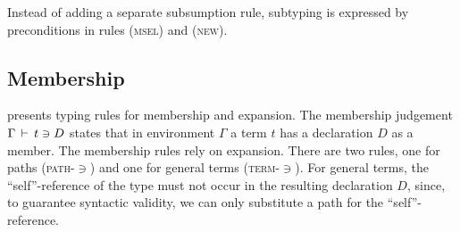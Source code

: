 \documentclass[9pt]{sigplanconf}
\begin{document}
Instead of adding a separate subsumption rule, subtyping is expressed
by preconditions in rules (\textsc{msel}) and (\textsc{new}).


\subsection{Membership}\label{mem}

 presents typing rules for membership and expansion.
The membership judgement $\Gamma \,\vdash\, t \ni D$ states that in
environment $\Gamma$ a term $t$ has a declaration $D$ as a member. The
membership rules rely on expansion. There are two rules, one for paths
(\textsc{path-$\ni$}) and one for general terms
(\textsc{term-$\ni$}). For general terms, the ``self''-reference of
the type must not occur in the resulting declaration $D$, since, to
guarantee syntactic validity, we can only substitute a path for the
``self''-reference.
\end{document}
